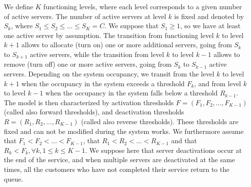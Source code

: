 \documentclass[conference]{IEEEtran}
\begin{document}
We define   $K$ functioning levels, where each level corresponds to a given number of active servers. The number of active servers at level $k$ is
fixed and denoted by $S_k$, where $S_{1} \leq S_{2} \leq ... \leq S_{K}=C$. We suppose that $S_1 \geq 1$, so we have  at least  
one active server by assumption. The transition from functioning level $k$ to level $k+1$ allows to allocate (turn on) one or more additional servers, going from
$S_k$ to $S_{k+1}$ active servers, while the transition from level $k$ to level $k-1$ allows to remove (turn off) one or more active servers,
going from $S_k$ to $S_{k-1}$ active servers. Depending on the system occupancy, we transit from the level $k$ to level $k+1$ when the occupancy in
the system exceeds a threshold $F_{k}$, and from level $k$ to level $k-1$ when the occupancy in the system falls below a threshold  $R_{k-1}$.
The model is then characterized by activation thresholds  $F=(F_{1}, F_{2}, ..., F_{K-1})$ (called also forward thresholds), and deactivation
thresholds $R=(R_{1}, R_{2}, ..., R_{K-1})$ (called also reverse thresholds).
These thresholds are fixed and can not be modified during the system works.
We furthermore assume  that $F_{1}<F_{2}< ...<F_{K-1}$, that $R_{1}<R_{2}< ...<R_{K-1}$ and that $R_{k}<F_{k}, \forall k, 1 \leq k \leq K-1$.
We suppose here that server deactivations occur at the end of the service, and when multiple servers are deactivated at the same times,
all the customers who have not completed their service return to the queue.
\end{document}
